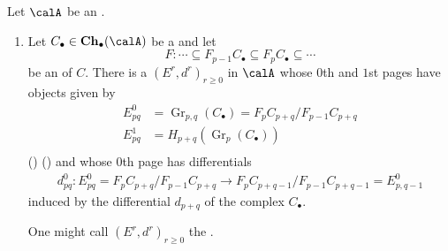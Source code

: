 \begin{theorem} \label{theorem:construction_theorem_of_spectral_sequences_from_a_filtration_on_a_complex_in_a_abelian_category}
    Let $\calA$ be an . 
    \begin{enumerate}
        \item Let $C_\bullet \in \mathbf{Ch}_\bullet(\calA)$ be a  and let 
        $$F: \cdots \subseteq F_{p-1} C_\bullet \subseteq F_{p} C_\bullet \subseteq \cdots $$
        be an  of $C$. There is a  $(E^r, d^r)_{r \geq 0}$ in $\calA$ whose $0$th and $1$st pages have objects given by 
        \begin{align*}
            E^0_{pq} &= \operatorname{Gr}_{p,q}(C_{\bullet}) = F_p C_{p+q} / F_{p-1} C_{p+q} \\
            E^1_{pq} &= H_{p+q}(\operatorname{Gr}_p(C_{\bullet})) \\
        \end{align*}
        () ()
        and whose $0$th page has differentials 
        \begin{align*}
            d^0_{pq}: E^0_{pq} = F_p C_{p+q} / F_{p-1} C_{p+q} \to F_p C_{p+q-1} / F_{p-1} C_{p+q-1} = E^0_{p, q-1}
        \end{align*}
        induced by the differential $d_{p+q}$ of the complex $C_\bullet$.

        One might call $(E^r, d^r)_{r \geq 0}$ the .


\end{enumerate}
\end{theorem}
